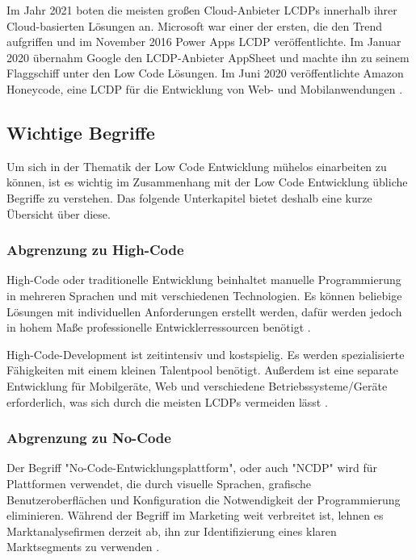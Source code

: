 \documentclass[12pt]{article} %
\begin{document}
	Im Jahr 2021 boten die meisten großen Cloud-Anbieter LCDPs innerhalb ihrer Cloud-basierten Lösungen an. Microsoft war einer der ersten, die den Trend aufgriffen und im November 2016 Power Apps LCDP veröffentlichte. Im Januar 2020 übernahm Google den LCDP-Anbieter AppSheet und machte ihn zu seinem Flaggschiff unter den Low Code Lösungen. Im Juni 2020 veröffentlichte Amazon Honeycode, eine LCDP für die Entwicklung von Web- und Mobilanwendungen \autocite{DiRuscio.2022}.
	
	\subsection{Wichtige Begriffe}
	Um sich in der Thematik der Low Code Entwicklung mühelos einarbeiten zu können, ist es wichtig im Zusammenhang mit der Low Code Entwicklung übliche Begriffe zu verstehen. Das folgende Unterkapitel bietet deshalb eine kurze Übersicht über diese.
	
	\subsubsection{Abgrenzung zu High-Code}
	High-Code oder traditionelle Entwicklung beinhaltet manuelle Programmierung in mehreren Sprachen und mit verschiedenen Technologien. Es können beliebige Lösungen mit individuellen Anforderungen erstellt werden, dafür werden jedoch in hohem Maße professionelle Entwicklerressourcen benötigt \autocite{Mendix.2023}. \newline
	
	High-Code-Development ist zeitintensiv und kostspielig. Es werden spezialisierte Fähigkeiten mit einem kleinen Talentpool benötigt. Außerdem ist eine separate Entwicklung für Mobilgeräte, Web und verschiedene Betriebssysteme/Geräte erforderlich, was sich durch die meisten LCDPs vermeiden lässt \autocite{Mendix.2023}. 
	
	\subsubsection{Abgrenzung zu No-Code}
	Der Begriff "No-Code-Entwicklungsplattform", oder auch "NCDP" wird für Plattformen verwendet, die durch visuelle Sprachen, grafische Benutzeroberflächen und Konfiguration die Notwendigkeit der Programmierung eliminieren. Während der Begriff im Marketing weit verbreitet ist, lehnen es Marktanalysefirmen derzeit ab, ihn zur Identifizierung eines klaren Marktsegments zu verwenden \autocite{DiRuscio.2022}. \newline
	
\end{document}
